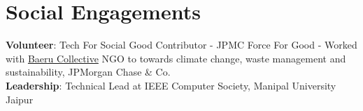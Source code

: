 \section{Social Engagements}
    \begin{itemize}[leftmargin=0.15in, label={}]
    \small{\item{
        \textbf{Volunteer}{:  Tech For Social Good Contributor - JPMC Force For Good - Worked with \href{https://baeru.org/}{Baeru Collective} NGO to towards climate change, waste management and sustainability, JPMorgan Chase \& Co.} \\
        \textbf{Leadership}{: Technical Lead at IEEE Computer Society, Manipal University Jaipur } \\
    }}
    \end{itemize}